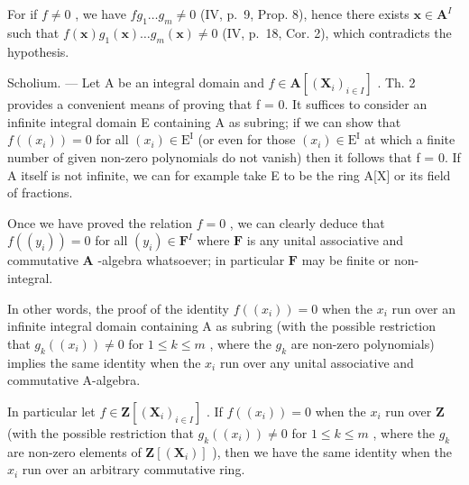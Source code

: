 For if \(f \neq 0\) , we have \(fg_1 \ldots g_m \neq 0\) (IV, p.~9, Prop. 8), hence there exists \(\mathbf{x} \in \mathbf{A}^{I}\) such that \(f(\mathbf{x})g_1(\mathbf{x}) \ldots g_m(\mathbf{x}) \neq 0\) (IV, p.~18, Cor. 2), which contradicts the hypothesis.

Scholium. --- Let A be an integral domain and \(f \in \mathbf{A}[(\mathbf{X}_i)_{i \in I}]\) . Th. 2 provides a convenient means of proving that f = 0. It suffices to consider an infinite integral domain E containing A as subring; if we can show that \(f((x_i)) = 0\) for all \((x_i) \in \mathrm{E}^{\mathrm{I}}\) (or even for those \((x_i) \in \mathrm{E}^{\mathrm{I}}\) at which a finite number of given non-zero polynomials do not vanish) then it follows that f = 0. If A itself is not infinite, we can for example take E to be the ring A{[}X{]} or its field of fractions.

Once we have proved the relation \(f = 0\) , we can clearly deduce that \(f((y_i)) = 0\) for all \((y_i) \in \mathbf{F}^{I}\) where \(\mathbf{F}\) is any unital associative and commutative \(\mathbf{A}\) -algebra whatsoever; in particular \(\mathbf{F}\) may be finite or non-integral.

In other words, the proof of the identity \(f((x_{i})) = 0\) when the \(x_{i}\) run over an infinite integral domain containing A as subring (with the possible restriction that \(g_{k}((x_{i})) \neq 0\) for \(1 \leqslant k \leqslant m\) , where the \(g_{k}\) are non-zero polynomials) implies the same identity when the \(x_{i}\) run over any unital associative and commutative A-algebra.

In particular let \(f \in \mathbf{Z}[(\mathbf{X}_i)_{i \in I}]\) . If \(f((x_i)) = 0\) when the \(x_i\) run over \(\mathbf{Z}\) (with the possible restriction that \(g_k((x_i)) \neq 0\) for \(1 \leqslant k \leqslant m\) , where the \(g_k\) are non-zero elements of \(\mathbf{Z}[(\mathbf{X}_i)]\) ), then we have the same identity when the \(x_i\) run over an arbitrary commutative ring.

